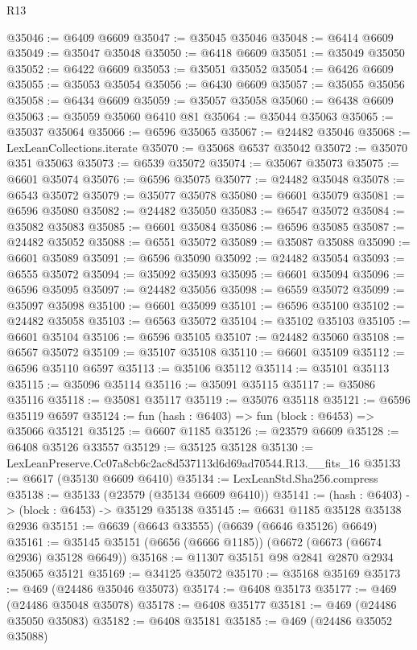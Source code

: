 \begin{lexlean}{R13}
\begin{coremodule}
@35046 := @6409 @6609
@35047 := @35045 @35046
@35048 := @6414 @6609
@35049 := @35047 @35048
@35050 := @6418 @6609
@35051 := @35049 @35050
@35052 := @6422 @6609
@35053 := @35051 @35052
@35054 := @6426 @6609
@35055 := @35053 @35054
@35056 := @6430 @6609
@35057 := @35055 @35056
@35058 := @6434 @6609
@35059 := @35057 @35058
@35060 := @6438 @6609
@35063 := @35059 @35060 @6410 @81
@35064 := @35044 @35063
@35065 := @35037 @35064
@35066 := @6596 @35065
@35067 := @24482 @35046
@35068 := LexLeanCollections.iterate
@35070 := @35068 @6537 @35042
@35072 := @35070 @351 @35063
@35073 := @6539 @35072
@35074 := @35067 @35073
@35075 := @6601 @35074
@35076 := @6596 @35075
@35077 := @24482 @35048
@35078 := @6543 @35072
@35079 := @35077 @35078
@35080 := @6601 @35079
@35081 := @6596 @35080
@35082 := @24482 @35050
@35083 := @6547 @35072
@35084 := @35082 @35083
@35085 := @6601 @35084
@35086 := @6596 @35085
@35087 := @24482 @35052
@35088 := @6551 @35072
@35089 := @35087 @35088
@35090 := @6601 @35089
@35091 := @6596 @35090
@35092 := @24482 @35054
@35093 := @6555 @35072
@35094 := @35092 @35093
@35095 := @6601 @35094
@35096 := @6596 @35095
@35097 := @24482 @35056
@35098 := @6559 @35072
@35099 := @35097 @35098
@35100 := @6601 @35099
@35101 := @6596 @35100
@35102 := @24482 @35058
@35103 := @6563 @35072
@35104 := @35102 @35103
@35105 := @6601 @35104
@35106 := @6596 @35105
@35107 := @24482 @35060
@35108 := @6567 @35072
@35109 := @35107 @35108
@35110 := @6601 @35109
@35112 := @6596 @35110 @6597
@35113 := @35106 @35112
@35114 := @35101 @35113
@35115 := @35096 @35114
@35116 := @35091 @35115
@35117 := @35086 @35116
@35118 := @35081 @35117
@35119 := @35076 @35118
@35121 := @6596 @35119 @6597
@35124 := fun (hash : @6403) => fun (block : @6453) => @35066 @35121
@35125 := @6607 @1185
@35126 := @23579 @6609
@35128 := @6408 @35126 @33557
@35129 := @35125 @35128
@35130 := LexLeanPreserve.Cc07a8cb6c2ac8d537113d6d69ad70544.R13.__fits_16
@35133 := @6617 (@35130 @6609 @6410)
@35134 := LexLeanStd.Sha256.compress
@35138 := @35133 (@23579 (@35134 @6609 @6410))
@35141 := (hash : @6403) -> (block : @6453) -> @35129 @35138
@35145 := @6631 @1185 @35128 @35138 @2936
@35151 := @6639 (@6643 @33555) (@6639 (@6646 @35126) @6649)
@35161 := @35145 @35151 (@6656 (@6666 @1185)) (@6672 (@6673 (@6674 @2936) @35128 @6649))
@35168 := @11307 @35151 @98 @2841 @2870 @2934 @35065 @35121
@35169 := @34125 @35072
@35170 := @35168 @35169
@35173 := @469 (@24486 @35046 @35073)
@35174 := @6408 @35173
@35177 := @469 (@24486 @35048 @35078)
@35178 := @6408 @35177
@35181 := @469 (@24486 @35050 @35083)
@35182 := @6408 @35181
@35185 := @469 (@24486 @35052 @35088)

\end{coremodule}
\end{lexlean}
